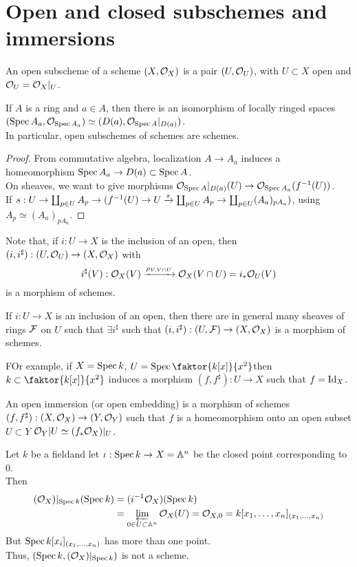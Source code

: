 \documentclass[../main.tex]{subfiles}
\begin{document}
\section{Open and closed subschemes and immersions}
\begin{defn}
	An open subscheme of a scheme $( X,\mathcal{O}_X) $ is a pair $( U, \mathcal{O}_U) $, with $U \subset X$ open and $\mathcal{O}_U= \mathcal{O}_X|_U$.
\end{defn}
\begin{lemma}
If $A$ is a ring and $a\in A$, then there is an isomorphism of locally ringed spaces $ ( \operatorname{Spec} A_a, \mathcal{O}_{\operatorname{Spec} A_a} ) \simeq ( D( a) , \mathcal{O}_{\operatorname{Spec} A} |_{D( a) } ) $.\\
In particular, open subschemes of schemes are schemes.
\end{lemma}
\begin{proof}
From commutative algebra, localization $A\to A_a$ induces a homeomorphism $\operatorname{Spec} A_a\to D( a) \subset \operatorname{Spec} A$.\\
On sheaves, we want to give morphisms $\mathcal{O}_{\operatorname{Spec} A} |_{D( a) } ( U) \to \mathcal{O}_{\operatorname{Spec} A_{a} }( f^{-1}( U) ) $.\\
If $s: U \to \coprod_{p \in U} A_p \to ( f^{-1}( U) \to U \xrightarrow{s} \coprod_{p \in U} A_p \to \coprod_{p \in U} ( A_a)_{p A_a}) $, using $A_p \simeq ( A_a) _{p A_a} $.
\end{proof}
Note that, if $i:U\to X$ is the inclusion of an open, then $( i,i^{\sharp}) :( U,\mathcal{O}_U) \to ( X,\mathcal{O}_X) $ with
\[ 
	i^{\sharp}( V) : \mathcal{O}_X( V) \xrightarrow{\rho_{V,V\cap U} }\mathcal{O}_X( V\cap U) = i_\ast\mathcal{O}_U( V) 
\]
is a morphism of schemes.\\
\begin{rmq}
If $i:U\to X$ is an inclusion of an open, then there are in general many sheaves of rings $\mathcal{F}$ on $U$ such that $\exists i^{\sharp}$ such that $( i,i^{\sharp}) :( U,\mathcal{F}) \to ( X,\mathcal{O}_X) $ is a morphism of schemes.
\end{rmq}
FOr example, if $X= \operatorname{Spec} k$, $U = \spec \faktor{k[x]}{x^{2}}$then $k \subset \faktor{k[x]}{x^{2}}$  induces a morphism $( f,f^{\sharp}) : U \to X$ such that $f= \operatorname{Id}_X$.
\begin{defn}
	An open immersion (or open embedding) is a morphism of schemes $( f,f^{\sharp}) : ( X,\mathcal{O}_X) \to ( Y,\mathcal{O}_Y) $ such that $f$ is a homeomorphism onto an open subset $U \subset Y$ $\mathcal{O}_Y|U \simeq ( f_\ast\mathcal{O}_X )|_U$.
\end{defn}
\begin{exemple}
Let $k$ be a fieldand let $\iota:\operatorname{Spec} k \to X= \mathbb{A}^{n}$ be the closed point corresponding to $0$.\\
Then
\begin{align*}
	( \mathcal{O}_X) |_{\operatorname{Spec} k} ( \operatorname{Spec} k) &= ( i^{-1} \mathcal{O}_X) ( \operatorname{Spec} k) \\
	&= \varprojlim_{0 \in U \subset \mathbb{A}^{n}}  \mathcal{O}_X( U) = \mathcal{O}_{X,0} = k [ x_1,\ldots,x_n] _{( x_1,\ldots,x_n) } 
\end{align*}
But $\operatorname{Spec} k[x_i]_{( x_1,\ldots,x_n) } $ has more than one point.\\
Thus, $( \operatorname{Spec} k, ( \mathcal{O}_X) |_{\operatorname{Spec} k} ) $ is not a scheme.
\end{exemple}
\end{document}
